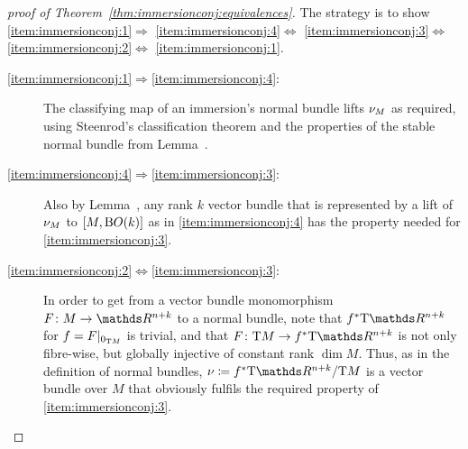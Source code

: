 \begin{proof}[proof of Theorem~\ref{thm:immersionconj:equivalences}]
  The strategy is to show
  \ref{item:immersionconj:1}$\Rightarrow$%
  \ref{item:immersionconj:4}$\Leftrightarrow$%
  \ref{item:immersionconj:3}$\Leftrightarrow$%
  \ref{item:immersionconj:2}$\Leftrightarrow$%
  \ref{item:immersionconj:1}.
  \begin{description}
  \item[\ref{item:immersionconj:1}$\Rightarrow$\ref{item:immersionconj:4}:]
    The classifying map of an immersion's normal bundle
    lifts $\nu_{M}$ as required,
    using Steenrod's classification theorem
     and the properties
    of the stable normal bundle from
    Lemma~.
  \item[\ref{item:immersionconj:4}$\Rightarrow$\ref{item:immersionconj:3}:]
    Also by
    Lemma~,
    any rank $k$ vector bundle that is represented by a lift of
    $\nu_{M}$ to $[M,\mathrm{B}O(k)]$ as in \ref{item:immersionconj:4} has
    the property needed for \ref{item:immersionconj:3}.
  \item[\ref{item:immersionconj:2}$\Leftrightarrow$\ref{item:immersionconj:3}:]
    In order to get from a vector bundle monomorphism
    $F\colon M\to\R^{n+k}$ to a normal bundle, note that
    $\pb f\T{\R^{n+k}}$ for $f=F|_{0_{\mathrm{T}M}}$ is 
    trivial, and that $F\colon \T M\to \pb f\T{\R^{n+k}}$ is not only
    fibre-wise, but globally injective of constant rank
    $\dim M$.
    Thus, as in the definition of normal bundles,
    $\N{}\coloneqq\pb f\T{\R^{n+k}}/\T M$ is a vector bundle over $M$
    that obviously fulfils the required property of
    \ref{item:immersionconj:3}.
    

\end{description}
\end{proof}
